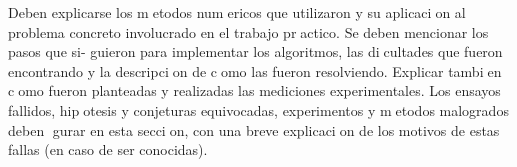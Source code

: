 Deben  explicarse  los  metodos  numericos  que  utilizaron  y  su  aplicacion  al  problema
concreto  involucrado  en  el  trabajo  practico.   Se  deben  mencionar  los  pasos  que  si-
guieron para implementar los algoritmos, las dicultades que fueron encontrando y la
descripcion de como las fueron resolviendo.  Explicar tambien como fueron planteadas
y realizadas las mediciones experimentales.  Los ensayos fallidos, hipotesis y conjeturas
equivocadas,  experimentos  y  metodos  malogrados  deben  gurar  en  esta  seccion,  con
una breve explicacion de los motivos de estas fallas (en caso de ser conocidas).

